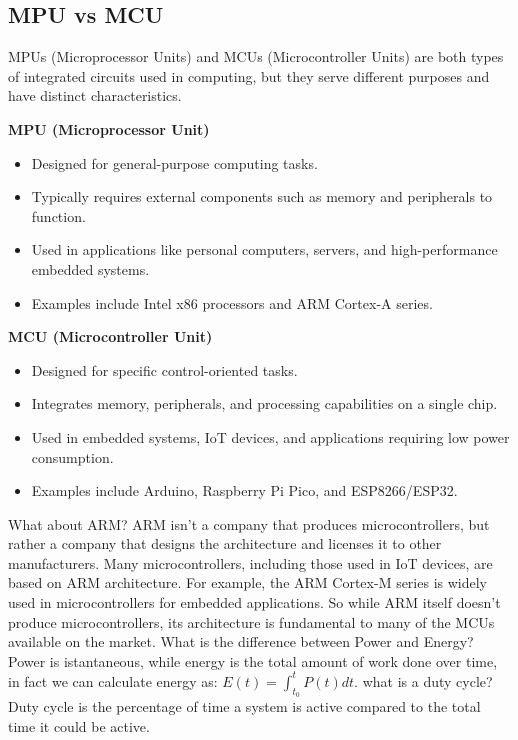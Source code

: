 \subsection{MPU vs MCU}
MPUs (Microprocessor Units) and MCUs (Microcontroller Units) are both types of
integrated circuits used in computing, but they serve different purposes and
have distinct characteristics.
\begin{tcolorbox}
    \textbf{MPU (Microprocessor Unit)}
    \begin{itemize}
        \item Designed for general-purpose computing tasks.
        \item Typically requires external components such as memory and peripherals to
              function.
        \item Used in applications like personal computers, servers, and high-performance
              embedded systems.
        \item Examples include Intel x86 processors and ARM Cortex-A series.
    \end{itemize}
\end{tcolorbox}
\begin{tcolorbox}
    \textbf{MCU (Microcontroller Unit)}
    \begin{itemize}
        \item Designed for specific control-oriented tasks.
        \item Integrates memory, peripherals, and processing capabilities on a single chip.
        \item Used in embedded systems, IoT devices, and applications requiring low power
              consumption.
        \item Examples include Arduino, Raspberry Pi Pico, and ESP8266/ESP32.
    \end{itemize}
\end{tcolorbox}
What about ARM? ARM isn't a company that produces microcontrollers, but rather a company that designs the architecture and licenses it to other manufacturers. Many microcontrollers, including those used in IoT devices, are based on ARM architecture. For example, the ARM Cortex-M series is widely used in microcontrollers for embedded applications. So while ARM itself doesn't produce microcontrollers, its architecture is fundamental to many of the MCUs available on the market.
What is the difference between Power and Energy? Power is istantaneous, while energy is the total amount of work done over time, in fact we can calculate energy as: $E(t) = \int_{t_0}^{t} P(t) dt$.
what is a duty cycle? Duty cycle is the percentage of time a system is active compared to the total time it could be active.
